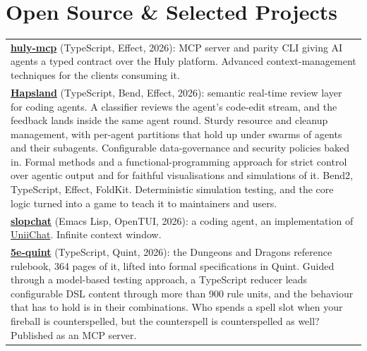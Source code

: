 \documentclass[letterpaper,10pt]{article}
\begin{document}
\section{Open Source \& Selected Projects}
\begin{longtable}{@{}p{}@{}}
  \faGithub{} \textbf{\href{https://github.com/dearlordylord/huly-mcp}{huly-mcp}} (TypeScript, Effect, 2026): MCP server and parity CLI giving AI agents a typed contract over the Huly platform. Advanced context-management techniques for the clients consuming it.\\[0.5em]
  \faGithub{} \textbf{\href{https://github.com/dearlordylord/hapsland}{Hapsland}} (TypeScript, Bend, Effect, 2026): semantic real-time review layer for coding agents. A classifier reviews the agent's code-edit stream, and the feedback lands inside the same agent round. Sturdy resource and cleanup management, with per-agent partitions that hold up under swarms of agents and their subagents. Configurable data-governance and security policies baked in. Formal methods and a functional-programming approach for strict control over agentic output and for faithful visualisations and simulations of it. Bend2, TypeScript, Effect, FoldKit. Deterministic simulation testing, and the core logic turned into a game to teach it to maintainers and users.\\[0.5em]
  \faGithub{} \textbf{\href{https://github.com/dearlordylord/slopchat}{slopchat}} (Emacs Lisp, OpenTUI, 2026): a coding agent, an implementation of \href{https://gist.github.com/VictorTaelin/91837951a5ce5b38f341ec1ba1df6449}{UniiChat}. Infinite context window.\\[0.5em]
  \faGithub{} \textbf{\href{https://github.com/dearlordylord/5e-quint}{5e-quint}} (TypeScript, Quint, 2026): the Dungeons and Dragons reference rulebook, 364 pages of it, lifted into formal specifications in Quint. Guided through a model-based testing approach, a TypeScript reducer leads configurable DSL content through more than 900 rule units, and the behaviour that has to hold is in their combinations. Who spends a spell slot when your fireball is counterspelled, but the counterspell is counterspelled as well? Published as an MCP server.
\end{longtable}

\renewcommand{\arraystretch}{1.0}
\end{document}
